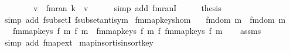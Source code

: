 \begin{isabellebody}
\ \ \isamarkupfalse%
\isanewline
\ \ \isamarkupfalse%
\ \isamarkupfalse%
\ {\isachardoublequoteopen}v\ {\isacharbar}{\kern0pt}{\isasymin}{\isacharbar}{\kern0pt}\ fmran\ {\isacharbraceleft}{\kern0pt}k\ {\isachardollar}{\kern0pt}{\isachardollar}{\kern0pt}{\isacharcolon}{\kern0pt}{\isacharequal}{\kern0pt}\ v{\isacharbraceright}{\kern0pt}{\isachardoublequoteclose}\isanewline
\ \ \ \ \isamarkupfalse%
\ {\isacharparenleft}{\kern0pt}simp\ add{\isacharcolon}{\kern0pt}\ fmranI{\isacharparenright}{\kern0pt}\isanewline
\ \ \isamarkupfalse%
\ \isamarkupfalse%
\ {\isacharquery}{\kern0pt}thesis\isanewline
\ \ \ \ \isamarkupfalse%
\ {\isacharparenleft}{\kern0pt}simp\ add{\isacharcolon}{\kern0pt}\ fsubsetI\ fsubset{\isacharunderscore}{\kern0pt}antisym{\isacharparenright}{\kern0pt}\isanewline
{}\isamarkupfalse%
%
\endisatagproof
{\isafoldproof}%
%
\isadelimproof
\isanewline
%
\endisadelimproof
\isanewline
{}\isamarkupfalse%
\ fmmap{\isacharunderscore}{\kern0pt}keys{\isacharunderscore}{\kern0pt}hom{\isacharcolon}{\kern0pt}\isanewline
\ \ \ {\isachardoublequoteopen}fmdom{\isacharprime}{\kern0pt}\ m\ {\isasyminter}\ fmdom{\isacharprime}{\kern0pt}\ m\ {\isacharequal}{\kern0pt}\ {\isacharbraceleft}{\kern0pt}{\isacharbraceright}{\kern0pt}{\isachardoublequoteclose}\isanewline
\ \ \ {\isachardoublequoteopen}fmmap{\isacharunderscore}{\kern0pt}keys\ f\ {\isacharparenleft}{\kern0pt}m\ {\isacharplus}{\kern0pt}{\isacharplus}{\kern0pt}\isactrlsub f\ m\ {\isacharequal}{\kern0pt}\ fmmap{\isacharunderscore}{\kern0pt}keys\ f\ m\ {\isacharplus}{\kern0pt}{\isacharplus}{\kern0pt}\isactrlsub f\ fmmap{\isacharunderscore}{\kern0pt}keys\ f\ m\isanewline
%
\isadelimproof
\ \ %
\endisadelimproof
%
\isatagproof
{}\isamarkupfalse%
\ assms\isanewline
\ \ \isamarkupfalse%
\ {\isacharparenleft}{\kern0pt}simp\ add{\isacharcolon}{\kern0pt}\ fmap{\isacharunderscore}{\kern0pt}ext{\isacharparenright}{\kern0pt}%
\endisatagproof
{\isafoldproof}%
%
\isadelimproof
\isanewline
%
\endisadelimproof
\isanewline
{}\isamarkupfalse%
\ map{\isacharunderscore}{\kern0pt}insort{\isacharunderscore}{\kern0pt}is{\isacharunderscore}{\kern0pt}insort{\isacharunderscore}{\kern0pt}key{\isacharcolon}{\kern0pt}\isanewline

\end{isabellebody}
